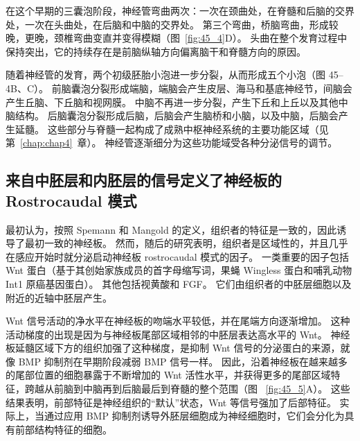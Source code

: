 在这个早期的三囊泡阶段，神经管弯曲两次：一次在颈曲处，在脊髓和后脑的交界处，一次在头曲处，在后脑和中脑的交界处。
第三个弯曲，桥脑弯曲，形成较晚，更晚，颈椎弯曲变直并变得模糊（图~\ref{fig:45_4}D）。
头曲在整个发育过程中保持突出，它的持续存在是前脑纵轴方向偏离脑干和脊髓方向的原因。


随着神经管的发育，两个初级胚胎小泡进一步分裂，从而形成五个小泡（图 45–4B、C）。
前脑囊泡分裂形成端脑，端脑会产生皮层、海马和基底神经节，间脑会产生丘脑、下丘脑和视网膜。
中脑不再进一步分裂，产生下丘和上丘以及其他中脑结构。
后脑囊泡分裂形成后脑，后脑会产生脑桥和小脑，以及中脑，后脑会产生延髓。
这些部分与脊髓一起构成了成熟中枢神经系统的主要功能区域（见第~\ref{chap:chap4}~章）。
神经管逐渐细分为这些功能域受各种分泌信号的调节。



\subsection{来自中胚层和内胚层的信号定义了神经板的 Rostrocaudal 模式}

最初认为，按照 Spemann 和 Mangold 的定义，组织者的特征是一致的，因此诱导了最初一致的神经板。
然而，随后的研究表明，组织者是区域性的，并且几乎在感应开始时就分泌启动神经板 rostrocaudal 模式的因子。
一类重要的因子包括 Wnt 蛋白（基于其创始家族成员的首字母缩写词，果蝇 Wingless 蛋白和哺乳动物 Int1 原癌基因蛋白）。
其他包括视黄酸和 FGF。 它们由组织者的中胚层细胞以及附近的近轴中胚层产生。


Wnt 信号活动的净水平在神经板的吻端水平较低，并在尾端方向逐渐增加。
这种活动梯度的出现是因为与神经板尾部区域相邻的中胚层表达高水平的 Wnt。
神经板延髓区域下方的组织加强了这种梯度，是抑制 Wnt 信号的分泌蛋白的来源，就像 BMP 抑制剂在早期阶段减弱 BMP 信号一样。
因此，沿着神经板在越来越多的尾部位置的细胞暴露于不断增加的 Wnt 活性水平，并获得更多的尾部区域特征，跨越从前脑到中脑再到后脑最后到脊髓的整个范围（图 ~\ref{fig:45_5}A）。
这些结果表明，前部特征是神经组织的“默认”状态，Wnt 等信号强加了后部特征。
实际上，当通过应用 BMP 抑制剂诱导外胚层细胞成为神经细胞时，它们会分化为具有前部结构特征的细胞。



